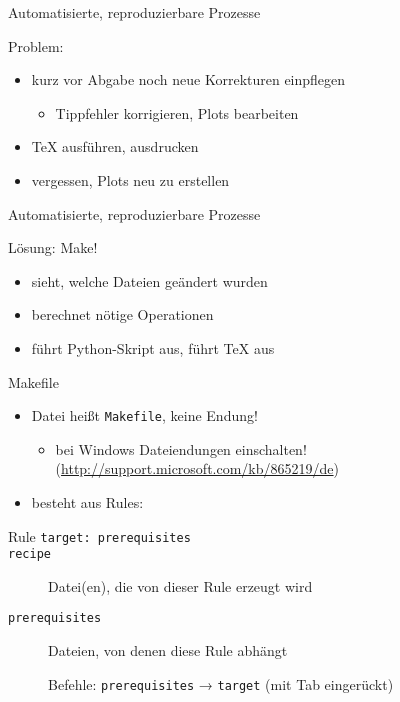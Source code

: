 \begin{frame}{Automatisierte, reproduzierbare Prozesse}

  {\huge Problem:}
  \vspace{1em}
  \begin{itemize}
    \item kurz vor Abgabe noch neue Korrekturen einpflegen
      \begin{itemize}
        \item Tippfehler korrigieren, Plots bearbeiten
      \end{itemize}
    \item \TeX{} ausführen, ausdrucken
    \item vergessen, Plots neu zu erstellen
  \end{itemize}
\end{frame}

\begin{frame}{Automatisierte, reproduzierbare Prozesse}

  {\huge Lösung: Make!}
  \vspace{1em}
  \begin{itemize}
    \item sieht, welche Dateien geändert wurden
    \item berechnet nötige Operationen
    \item führt Python-Skript aus, führt \TeX{} aus
  \end{itemize}
\end{frame}

\begin{frame}{Makefile}
  \begin{itemize}
    \item Datei heißt \texttt{Makefile}, keine Endung!
      \begin{itemize}
        \item bei Windows Dateiendungen einschalten! (\url{http://support.microsoft.com/kb/865219/de})
      \end{itemize}
    \item besteht aus Rules:
  \end{itemize}
  \begin{block}{Rule}
    \texttt{target: prerequisites\\
    \hspace{1cm} recipe}
  \end{block}
  \begin{description}
    \item[\texttt{\hphantom{prerequisites}}] Datei(en), die von dieser Rule erzeugt wird
    \item[\texttt{prerequisites}]                         Dateien, von denen diese Rule abhängt
    \item[\texttt{\hphantom{prerequisites}}] Befehle: \texttt{prerequisites} → \texttt{target} (mit Tab eingerückt)
  \end{description}
\end{frame}

